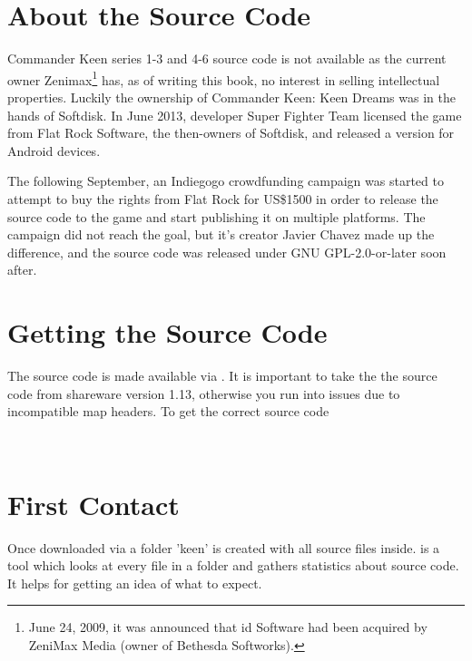 \documentclass[book.tex]{subfiles}
\begin{document}
\label{chapter_software_architecture}
\section{About the Source Code}
Commander Keen series 1-3 and 4-6 source code is not available as the current owner Zenimax\footnote{June 24, 2009, it was announced that id Software had been acquired by ZeniMax Media (owner of Bethesda Softworks).} has, as of writing this book, no interest in selling intellectual properties. Luckily the ownership of Commander Keen: Keen Dreams was in the hands of Softdisk. In June 2013, developer Super Fighter Team licensed the game from Flat Rock Software, the then-owners of Softdisk, and released a version for Android devices. \\
\par
The following September, an Indiegogo crowdfunding campaign was started to attempt to buy the rights from Flat Rock for US\$1500 in order to release the source code to the game and start publishing it on multiple platforms. The campaign did not reach the goal, but it's creator Javier Chavez made up the difference, and the source code was released under GNU GPL-2.0-or-later soon after.

\section{Getting the Source Code}
\par
The source code is made available via . It is important to take the the source code from shareware version 1.13, otherwise you run into issues due to incompatible map headers. To get the correct source code \\
\par
{}\\
\par
\section{First Contact}
Once downloaded via  a folder 'keen' is created with all source files inside.
 is a tool which looks at every file in a folder and gathers statistics about source code. It helps for getting an idea of what to expect.\\
\par

\begin{minipage}{\textwidth}

\end{minipage}
\end{document}
